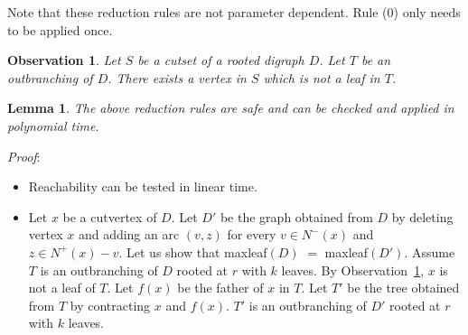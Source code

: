 \documentclass{article}
\newtheorem{lemma}{Lemma}
\newtheorem{obs}{Observation}
\begin{document}
Note that these reduction rules are not parameter dependent. Rule (0) only needs to be applied once.

\begin{obs}\label{obs1}
Let $S$ be a cutset of a rooted digraph $D$. Let $T$ be an outbranching of $D$. There exists a vertex in $S$ which is not a leaf in $T$.
\end{obs}

\begin{lemma}\label{rules}
The above reduction rules are safe and can be checked and applied in polynomial time.
\end{lemma}
\emph{Proof}:
\begin{itemize}
\item[(0)] Reachability can be tested in linear time.
\item[(1)] Let $x$ be a cutvertex of $D$. Let $D'$ be the graph obtained from $D$ by deleting vertex $x$ and adding an arc $(v,z)$ for every $v\in N^-(x)$ and $z\in N^+(x)-v$. Let us show that maxleaf$(D)$ $=$ maxleaf$(D')$. Assume $T$ is an outbranching of $D$ rooted at $r$ with $k$ leaves. By Observation~\ref{obs1}, $x$ is not a leaf of $T$. Let $f(x)$ be the father of $x$ in $T$. Let $T'$ be the tree obtained from $T$ by contracting $x$ and $f(x)$. $T'$ is an outbranching of $D'$ rooted at $r$ with $k$ leaves. 


\end{itemize}
\end{document}

